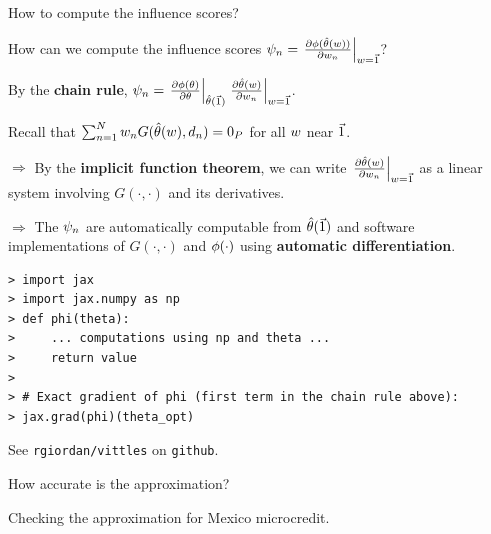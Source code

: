\begin{frame}[fragile]{How to compute the influence scores?}

How can we compute the influence scores
%
%
$
\infl_n =
\fracat{\partial \thetafun(\thetahat(\w))}
       {\partial\w_n}{\w = \onevec}
%
$?
%

\pause
\vspace{1em}
By the \textbf{chain rule},
$
\infl_n =
\fracat{\partial \thetafun(\theta)}
      {\partial\theta}{\thetahat(\onevec)}
\fracat{\partial \thetahat(\w)}
    {\partial\w_n}{\w = \onevec}
%
$.

\pause
\vspace{1em}
Recall that
$\sum_{n=1}^N w_n G(\hat{\theta}(w), d_{n}) =  0_{P}$ for all $w$ near $\vec{1}$.

\vspace{1em}
$\Rightarrow$
By the \textbf{implicit function theorem}, we can write
$\left.\frac{\partial\hat{\theta}(w)}{\partial w_n}\right|_{w=\vec{1}}$ as a linear system
involving $G(\cdot, \cdot)$ and its derivatives.

\pause
\vspace{1em}
$\Rightarrow$
The $\psi_n$ are automatically computable from $\hat{\theta}(\vec{1})$ and
software implementations of $G(\cdot, \cdot)$ and $\phi(\cdot)$
using \textbf{automatic differentiation}.

\begin{lstlisting}
> import jax
> import jax.numpy as np
> def phi(theta):
>     ... computations using np and theta ...
>     return value
>
> # Exact gradient of phi (first term in the chain rule above):
> jax.grad(phi)(theta_opt)
\end{lstlisting}

See \texttt{rgiordan/vittles} on \texttt{github}.

\end{frame}



\begin{frame}{How accurate is the approximation?}



\begin{center}
Checking the approximation for Mexico microcredit.
\end{center}


\end{frame}


